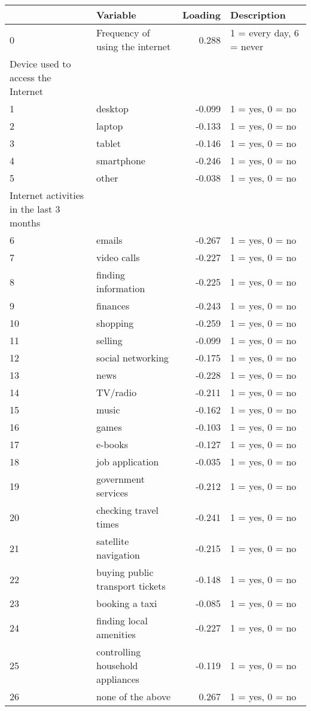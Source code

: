 \documentclass[11pt]{article}
\begin{document}
    \begin{tabular}{llrl}
        \toprule
        & Variable & Loading & Description \\
        \midrule
        0 & Frequency of using the internet & 0.288 & 1 = every day, 6 = never \\
        Device used to access the Internet & & & \\
        1 & desktop & -0.099 & 1 = yes, 0 = no \\
        2 & laptop & -0.133 & 1 = yes, 0 = no \\
        3 & tablet & -0.146 & 1 = yes, 0 = no \\
        4 & smartphone & -0.246 & 1 = yes, 0 = no \\
        5 & other & -0.038 & 1 = yes, 0 = no \\
        Internet activities in the last 3 months & & & \\
        6 & emails & -0.267 & 1 = yes, 0 = no \\
        7 & video calls & -0.227 & 1 = yes, 0 = no \\
        8 & finding information & -0.225 & 1 = yes, 0 = no \\
        9 & finances & -0.243 & 1 = yes, 0 = no \\
        10 & shopping & -0.259 & 1 = yes, 0 = no \\
        11 & selling & -0.099 & 1 = yes, 0 = no \\
        12 & social networking & -0.175 & 1 = yes, 0 = no \\
        13 & news & -0.228 & 1 = yes, 0 = no \\
        14 & TV/radio & -0.211 & 1 = yes, 0 = no \\
        15 & music & -0.162 & 1 = yes, 0 = no \\
        16 & games & -0.103 & 1 = yes, 0 = no \\
        17 & e-books & -0.127 & 1 = yes, 0 = no \\
        18 & job application & -0.035 & 1 = yes, 0 = no \\
        19 & government services & -0.212 & 1 = yes, 0 = no \\
        20 & checking travel times & -0.241 & 1 = yes, 0 = no \\
        21 & satellite navigation & -0.215 & 1 = yes, 0 = no \\
        22 & buying public transport tickets & -0.148 & 1 = yes, 0 = no \\
        23 & booking a taxi & -0.085 & 1 = yes, 0 = no \\
        24 & finding local amenities & -0.227 & 1 = yes, 0 = no \\
        25 & controlling household appliances & -0.119 & 1 = yes, 0 = no \\
        26 & none of the above & 0.267 & 1 = yes, 0 = no \\
        \bottomrule
    \end{tabular}
\end{document}
